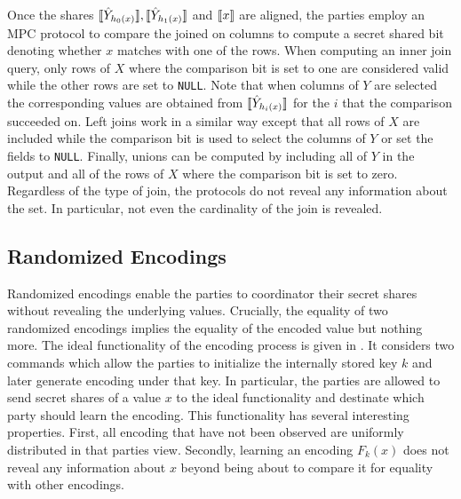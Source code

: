 Once the shares  $\llbracket \hat Y_{h_0(x)}\rrbracket, \llbracket \hat Y_{h_1(x)}\rrbracket$ and $\llbracket x\rrbracket$ are aligned, the parties employ an MPC protocol to compare the joined on columns to compute a secret shared bit denoting whether $x$ matches with one of the rows. When computing an inner join query, only rows of $X$ where the comparison bit is set to one are considered valid while the other rows are set to \texttt{NULL}. Note that when columns of $Y$ are selected the corresponding values are obtained from $\llbracket \hat Y_{h_i(x)}\rrbracket$ for the $i$ that the comparison succeeded on. Left joins work in a similar way except that all rows of $X$ are included while the comparison bit is used to select the columns of $Y$ or set the fields to \texttt{NULL}. Finally, unions can be computed by including all of $Y$ in the output and all of the rows of $X$ where the comparison bit is set to zero. Regardless of the type of join, the protocols do not reveal any information about the set. In particular, not even the cardinality of the join is revealed.

\subsection{Randomized Encodings}

Randomized encodings enable the parties to coordinator their secret shares without revealing the underlying values. Crucially, the equality  of two randomized encodings implies the equality of the encoded value but nothing more. The ideal functionality of the encoding process is given in . It considers two commands which allow the parties to initialize the internally stored key $k$ and later generate encoding under that key. In particular, the parties are allowed to send secret shares of a value $x$  to the ideal functionality and destinate which party should learn the encoding. This functionality has several interesting properties. First, all encoding that have not been observed are uniformly distributed in that parties view. Secondly, learning an encoding $F_k(x)$ does not reveal any information about $x$ beyond being about to compare it for equality with other encodings. 

